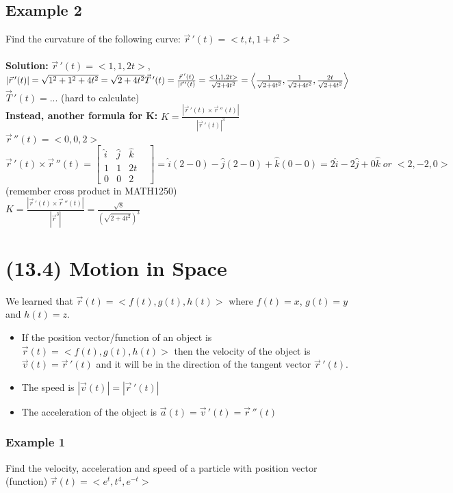 \documentclass{article}
\begin{document}
\subsection{Example 2}
Find the curvature of the following curve: $\vec{r}\,'(t)=<t,t,1+t^2>$
\\\\\textbf{Solution:} $\vec{r}\,'(t)=<1,1,2t>$, $|\vec{r}\,'(t)|=\sqrt{1^2+1^2+4t^2}=\sqrt{2+4t^2}
\\\vec{T}\,'(t)=\frac{\vec{r}\,'(t)}{|\vec{r}\,'(t)}=\frac{<1,1,2t>}{\sqrt{2+4t^2}}=\left<\frac{1}{\sqrt{2+4t^2}},\frac{1}{\sqrt{2+4t^2}},\frac{2t}{\sqrt{2+4t^2}} \right>$
\\$\vec{T}\,'(t)=...$ (hard to calculate)
\\\textbf{Instead, another formula for K:} $K=\frac{|\vec{r}\,'(t)\times\vec{r}\,''(t)|}{|\vec{r}\,'(t)|^3}$
\\$\vec{r}\,''(t)=<0,0,2>$
\\$\vec{r}\,'(t)\times\vec{r}\,''(t)=\begin{bmatrix}
    \hat{i} & \hat{j} & \hat{k} & \\
    1 & 1 & 2t \\
    0 & 0 & 2
\end{bmatrix}=\hat{i}(2-0)-\hat{j}(2-0)+\hat{k}(0-0)=2\hat{i}-2\hat{j}+0\hat{k}\;or\;<2,-2,0>$ (remember cross product in MATH1250)
\\$K=\frac{|\vec{r}\,'(t)\times\vec{r}\,''(t)|}{|\vec{r}^3|}=\frac{\sqrt{8}}{\left(\sqrt{2+4t^2}\right)^3}$
\newpage

\section{(13.4) Motion in Space}
We learned that $\vec{r}(t)=<f(t),g(t),h(t)>$ where $f(t)=x$, $g(t)=y$ and $h(t)=z$.
\begin{itemize}
    \item If the position vector/function of an object is $\vec{r}(t)=<f(t),g(t),h(t)>$ then the velocity of the object is $\vec{v}(t)=\vec{r}\,'(t)$ and it will be in the direction of the tangent vector $\vec{r}\,'(t)$.
    \item The speed is $\left|\vec{v}(t)\right|=\left|\vec{r}\,'(t)\right|$
    \item The acceleration of the object is $\vec{a}(t)=\vec{v}\,'(t)=\vec{r}\,''(t)$
\end{itemize}

\subsubsection{Example 1}
Find the velocity, acceleration and speed of a particle with position vector (function) $\vec{r}(t)=<e^t,t^4,e^{-t}>$
\end{document}
